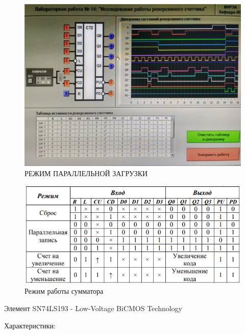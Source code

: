 \begin{figure}[H]
	\centering
	\includegraphics[width=0.95\linewidth]{imgs/14/3.jpg}
	\caption{РЕЖИМ ПАРАЛЛЕЛЬНОЙ ЗАГРУЗКИ}
	\label{fig:14_3}
\end{figure}

\begin{figure}[H]
	\centering
	\includegraphics[width=0.85\linewidth]{imgs/14/14_tab}
	\caption{Режим работы сумматора}
	\label{fig:14_tab}
\end{figure}

Элемент SN74LS193 - Low-Voltage BiCMOS Technology

Характеристики:

